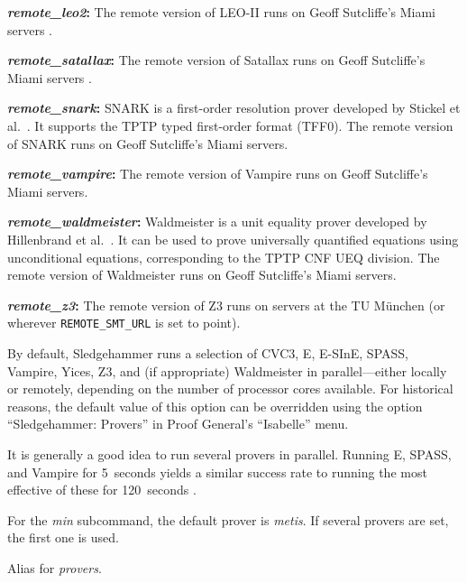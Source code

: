 \documentclass[a4paper,12pt]{article}
\begin{document}
\begin{enum}
\begin{enum}
\item[\labelitemi] \textbf{\textit{remote\_leo2}:} The remote version of LEO-II
runs on Geoff Sutcliffe's Miami servers \cite{sutcliffe-2000}.

\item[\labelitemi] \textbf{\textit{remote\_satallax}:} The remote version of
Satallax runs on Geoff Sutcliffe's Miami servers \cite{sutcliffe-2000}.

\item[\labelitemi] \textbf{\textit{remote\_snark}:} SNARK is a first-order
resolution prover developed by Stickel et al.\ \cite{snark}. It supports the
TPTP typed first-order format (TFF0). The remote version of SNARK runs on
Geoff Sutcliffe's Miami servers.

\item[\labelitemi] \textbf{\textit{remote\_vampire}:} The remote version of
Vampire runs on Geoff Sutcliffe's Miami servers.

\item[\labelitemi] \textbf{\textit{remote\_waldmeister}:} Waldmeister is a unit
equality prover developed by Hillenbrand et al.\ \cite{waldmeister}. It can be
used to prove universally quantified equations using unconditional equations,
corresponding to the TPTP CNF UEQ division. The remote version of Waldmeister
runs on Geoff Sutcliffe's Miami servers.

\item[\labelitemi] \textbf{\textit{remote\_z3}:} The remote version of Z3 runs on
servers at the TU M\"unchen (or wherever \texttt{REMOTE\_SMT\_URL} is set to
point).
\end{enum}

By default, Sledgehammer runs a selection of CVC3, E, E-SInE, SPASS, Vampire,
Yices, Z3, and (if appropriate) Waldmeister in parallel---either locally or
remotely, depending on the number of processor cores available. For historical
reasons, the default value of this option can be overridden using the option
``Sledgehammer: Provers'' in Proof General's ``Isabelle'' menu.

It is generally a good idea to run several provers in parallel. Running E,
SPASS, and Vampire for 5~seconds yields a similar success rate to running the
most effective of these for 120~seconds \cite{boehme-nipkow-2010}.

For the \textit{min} subcommand, the default prover is \textit{metis}. If
several provers are set, the first one is used.

Alias for \textit{provers}.


\end{enum}
\end{document}
